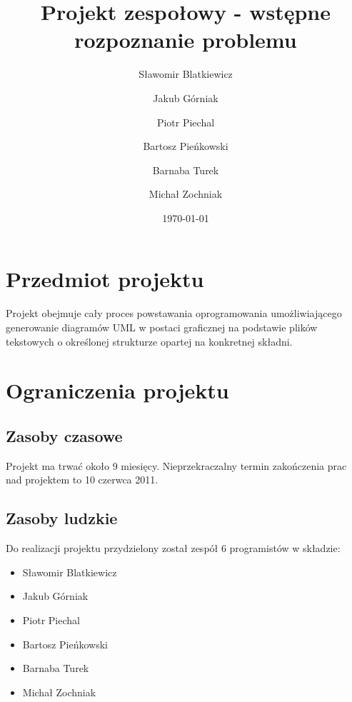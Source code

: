 \documentclass[a4paper,11pt]{article}
\begin{document}
\author{
  Sławomir Blatkiewicz\and
  Jakub Górniak       \and
  Piotr Piechal       \and
  Bartosz Pieńkowski  \and
  Barnaba Turek       \and
  Michał Zochniak
}

\title{Projekt zespołowy - wstępne rozpoznanie problemu}


\date{\today}

\maketitle %

\tableofcontents

\section{Przedmiot projektu}
Projekt obejmuje cały proces powstawania oprogramowania umożliwiającego generowanie diagramów UML w
postaci graficznej na podstawie plików tekstowych o określonej strukturze opartej na konkretnej
składni.

\section{Ograniczenia projektu}

\subsection{Zasoby czasowe}
Projekt ma trwać około 9 miesięcy. Nieprzekraczalny termin zakończenia prac nad projektem to 10
czerwca 2011.

\subsection{Zasoby ludzkie}
Do realizacji projektu przydzielony został zespół 6 programistów w składzie:
  \begin{itemize}
    \item{Sławomir Blatkiewicz}
    \item{Jakub Górniak}
    \item{Piotr Piechal}
    \item{Bartosz Pieńkowski}
    \item{Barnaba Turek}
    \item{Michał Zochniak}
  \end{itemize}
\end{document}
